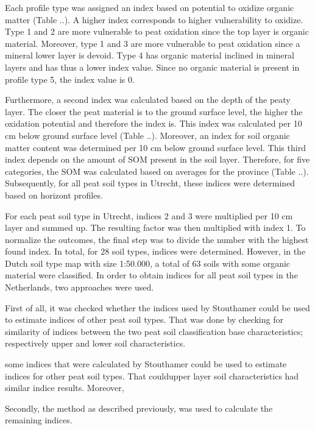 {\begin{enumerate}
Each profile type was assigned an index based on potential to oxidize organic matter (Table ..). A higher index corresponds to higher vulnerability to oxidize. Type 1 and 2 are more vulnerable to peat oxidation since the top layer is organic material. Moreover, type 1 and 3 are more vulnerable to peat oxidation since a mineral lower layer is devoid. Type 4 has organic material inclined in mineral layers and has thus a lower index value. Since no organic material is present in profile type 5, the index value is 0. 

Furthermore, a second index was calculated based on the depth of the peaty layer. The closer the peat material is to the ground surface level, the higher the oxidation potential and therefore the index is. This index was calculated per 10 cm below ground surface level (Table ..). Moreover, an index for soil organic matter content was determined per 10 cm below ground surface level. This third index depends on the amount of SOM present in the soil layer. Therefore, for five categories, the SOM was calculated based on averages for the province (Table ..). Subsequently, for all peat soil types in Utrecht, these indices were determined based on horizont profiles. 

For each peat soil type in Utrecht, indices 2 and 3 were multiplied per 10 cm layer and summed up. The resulting factor was then multiplied with index 1. To normalize the outcomes, the final step was to divide the number with the highest found index. In total, for 28 soil types, indices were determined. However, in the Dutch soil type map with size 1:50.000, a total of 63 soils with some organic material were classified. In order to obtain indices for all peat soil types in the Netherlands, two approaches were used. 

First of all, it was checked whether the indices used by Stouthamer could be used to estimate indices of other peat soil types. That was done by checking for similarity of indices between the two peat soil classification base characteristics; respectively upper and lower soil characteristics. 

some indices that were calculated by Stouthamer could be used to estimate indices for other peat soil types. That couldupper layer soil characteristics had similar indice results. Moreover, 

Secondly, the method as described previously, was used to calculate the remaining indices. 






\end{enumerate}}
